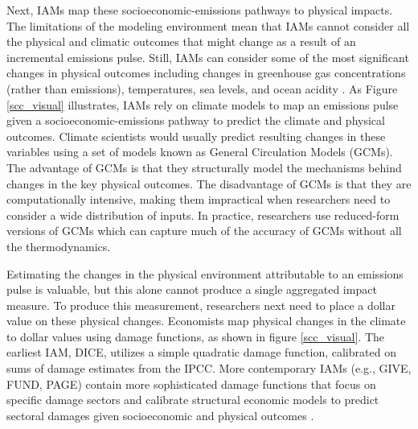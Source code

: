 Next, IAMs map these socioeconomic-emissions pathways to physical impacts. The limitations of the modeling environment mean that IAMs cannot consider all the physical and climatic outcomes that might change as a result of an incremental emissions pulse. Still, IAMs can consider some of the most significant changes in physical outcomes including changes in greenhouse gas concentrations (rather than emissions), temperatures, sea levels, and ocean acidity \citep{sccdatatool}. As Figure \ref{scc_visual} illustrates, IAMs rely on climate models to map an emissions pulse given a socioeconomic-emissions pathway to predict the climate and physical outcomes. Climate scientists would usually predict resulting changes in these variables using a set of models known as General Circulation Models (GCMs). The advantage of GCMs is that they structurally model the mechanisms behind changes in the key physical outcomes. The disadvantage of GCMs is that they are computationally intensive, making them impractical when researchers need to consider a wide distribution of inputs. In practice, researchers use reduced-form versions of GCMs which can capture much of the accuracy of GCMs without all the thermodynamics.

Estimating the changes in the physical environment attributable to an emissions pulse is valuable, but this alone cannot produce a single aggregated impact measure. To produce this measurement, researchers next need to place a dollar value on these physical changes. Economists map physical changes in the climate to dollar values using damage functions, as shown in figure \ref{scc_visual}. The earliest IAM, DICE, utilizes a simple quadratic damage function, calibrated on sums of damage estimates from the IPCC. More contemporary IAMs (e.g., GIVE, FUND, PAGE) contain more sophisticated damage functions that focus on specific damage sectors and calibrate structural economic models to predict sectoral damages given socioeconomic and physical outcomes \citep{national2017valuing}. 

